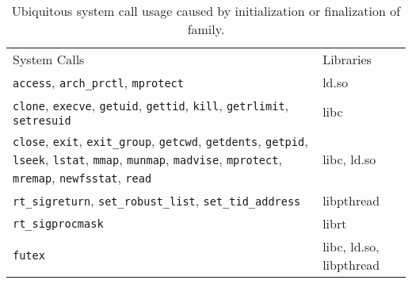 
 



\begin{table}[t]
\centering
\small
\begin{tabular}{>{\footnotesize\raggedright\arraybackslash}m{}>{\raggedright\arraybackslash}m{}}
\hline
\addlinespace
System Calls & Libraries \\
\addlinespace
\hline
{\tt access}, {\tt arch\_prctl}, {\tt mprotect} & ld.so \\
\hline
{\tt clone}, {\tt execve}, {\tt getuid}, {\tt gettid},
{\tt kill}, {\tt getrlimit}, {\tt setresuid} & libc \\
\hline
{\tt close}, {\tt exit}, {\tt exit\_group}, {\tt getcwd},
{\tt getdents}, {\tt getpid}, {\tt lseek}, {\tt lstat},
{\tt mmap}, {\tt munmap}, {\tt madvise}, {\tt mprotect},
{\tt mremap}, {\tt newfsstat}, {\tt read} &
libc, ld.so \\
\hline
{\tt rt\_sigreturn}, {\tt set\_robust\_list}, {\tt set\_tid\_address} &
libpthread \\
\hline
{\tt rt\_sigprocmask} &
librt \\
\hline
{\tt futex} &
libc, ld.so, libpthread \\
\hline
\end{tabular}
\footnotesize
\caption{Ubiquitous system call usage caused by initialization or finalization of \libc{} family.}
\label{table:libc-init-call}
\end{table}
